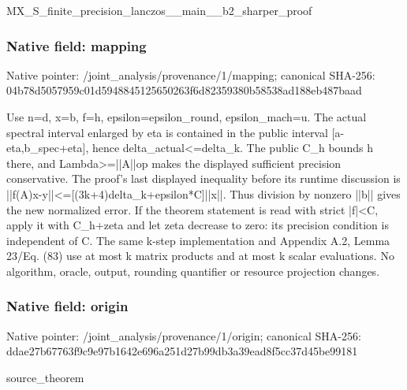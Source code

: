 \documentclass[10pt,a4paper]{article}
\begin{document}
\begingroup\raggedright\sloppy MX\_\allowbreak{}S\_\allowbreak{}finite\_\allowbreak{}precision\_\allowbreak{}lanczos\_\allowbreak{}\_\allowbreak{}main\_\allowbreak{}\_\allowbreak{}b2\_\allowbreak{}sharper\_\allowbreak{}proof\par\endgroup

\subsubsection{Native field: mapping}
Native pointer: /joint\_\allowbreak{}analysis/provenance/1/mapping; canonical SHA-256: 04b78d5057959c01d5948845125650263f6d82359380b58538ad188eb487baad

\begingroup\raggedright\sloppy Use n=\allowbreak{}d,\allowbreak{} x=\allowbreak{}b,\allowbreak{} f=\allowbreak{}h,\allowbreak{} epsilon=\allowbreak{}epsilon\_\allowbreak{}round,\allowbreak{} epsilon\_\allowbreak{}mach=\allowbreak{}u. The actual spectral interval enlarged by eta is contained in the public interval [a-eta,\allowbreak{}b\_\allowbreak{}spec+eta],\allowbreak{} hence delta\_\allowbreak{}actual<=\allowbreak{}delta\_\allowbreak{}k. The public C\_\allowbreak{}h bounds h there,\allowbreak{} and Lambda>=\allowbreak{}||A||op makes the displayed sufficient precision conservative. The proof's last displayed inequality before its runtime discussion is ||f(A)x-y||<=\allowbreak{}[(3k+4)delta\_\allowbreak{}k+epsilon*C]||x||. Thus division by nonzero ||b|| gives the new normalized error. If the theorem statement is read with strict |f|<C,\allowbreak{} apply it with C\_\allowbreak{}h+zeta and let zeta decrease to zero:\allowbreak{} its precision condition is independent of C. The same k-step implementation and Appendix A.2,\allowbreak{} Lemma 23/\allowbreak{}Eq. (83) use at most k matrix products and at most k scalar evaluations. No algorithm,\allowbreak{} oracle,\allowbreak{} output,\allowbreak{} rounding quantifier or resource projection changes.\par\endgroup

\subsubsection{Native field: origin}
Native pointer: /joint\_\allowbreak{}analysis/provenance/1/origin; canonical SHA-256: ddae27b67763f9c9e97b1642e696a251d27b99db3a39ead8f5cc37d45be99181

\begingroup\raggedright\sloppy source\_\allowbreak{}theorem\par\endgroup
\end{document}
